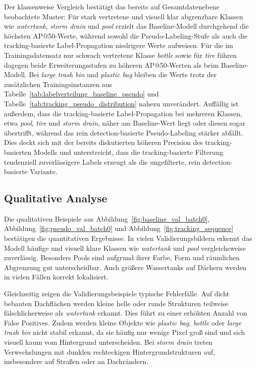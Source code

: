 Der klassenweise Vergleich bestätigt das bereits auf Gesamtdatenebene
beobachtete Muster: Für stark vertretene und visuell klar abgrenzbare
Klassen wie \textit{watertank}, \textit{storm drain} und \textit{pool}
erzielt das Baseline-Modell durchgehend die höchsten AP@50-Werte, während
sowohl die Pseudo-Labeling-Stufe als auch die tracking-basierte
Label-Propagation niedrigere Werte aufweisen. Für die im Trainingsdatensatz
nur schwach vertretene Klasse \textit{bottle} sowie für \textit{tire} führen
dagegen beide Erweiterungsstufen zu höheren AP@50-Werten als beim
Baseline-Modell. Bei \textit{large trash bin} und \textit{plastic bag}
bleiben die Werte trotz der zusätzlichen Trainingsinstanzen aus
Tabelle~\ref{tab:labelverteilung_baseline_pseudo} und
Tabelle~\ref{tab:tracking_pseudo_distribution} nahezu unverändert. Auffällig
ist außerdem, dass die tracking-basierte Label-Propagation bei mehreren
Klassen, etwa \textit{pool}, \textit{tire} und \textit{storm drain}, näher
am Baseline-Wert liegt oder diesen sogar übertrifft, während das rein
detection-basierte Pseudo-Labeling stärker abfällt. Dies deckt sich mit der
bereits diskutierten höheren Precision des tracking-basierten Modells und
unterstreicht, dass die tracking-basierte Filterung tendenziell
zuverlässigere Labels erzeugt als die ungefilterte, rein detection-basierte
Variante.

\subsection{Qualitative Analyse}

Die qualitativen Beispiele aus Abbildung~\ref{fig:baseline_val_batch0},
Abbildung~\ref{fig:pseudo_val_batch0} und Abbildung~\ref{fig:tracking_sequence}
bestätigen die quantitativen Ergebnisse. In vielen Validierungsbildern erkennt das
Modell häufige und visuell klare Klassen wie \textit{watertank} und \textit{pool}
vergleichsweise zuverlässig. Besonders Pools sind aufgrund ihrer Farbe, Form und
räumlichen Abgrenzung gut unterscheidbar. Auch größere Wassertanks auf Dächern
werden in vielen Fällen korrekt lokalisiert.

Gleichzeitig zeigen die Validierungsbeispiele typische Fehlerfälle. Auf dicht
bebauten Dachflächen werden kleine helle oder runde Strukturen teilweise
fälschlicherweise als \textit{watertank} erkannt. Dies führt zu einer erhöhten Anzahl
von False Positives. Zudem werden kleine Objekte wie \textit{plastic bag},
\textit{bottle} oder \textit{large trash bin} nicht stabil erkannt, da sie häufig nur
wenige Pixel groß sind und sich visuell kaum vom Hintergrund unterscheiden. Bei
\textit{storm drain} treten Verwechslungen mit dunklen rechteckigen
Hintergrundstrukturen auf, insbesondere auf Straßen oder an Dachrändern.

